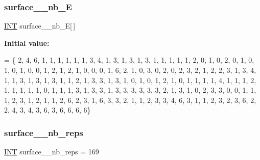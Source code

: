 \mbox{\label{surface__47_8_c_a28f7085424b2880a249384d131b2d762}} 
\subsubsection{\texorpdfstring{surface\+\_\+\_\+nb\+\_\+E}{surface\_47\_nb\_E}}
{\footnotesize\ttfamily \mbox{\hyperlink{galois_8h_a09fddde158a3a20bd2dcadb609de11dc}{I\+NT}} surface\+\_\+\_\+nb\+\_\+E\mbox{[}$\,$\mbox{]}}

{\bfseries Initial value\+:}
\begin{DoxyCode}
= \{ 
    2, 4, 6, 1, 1, 1, 1, 1, 1, 3, 
    4, 1, 3, 1, 3, 1, 3, 1, 1, 1, 
    1, 1, 2, 0, 1, 0, 2, 0, 1, 0, 
    1, 0, 1, 0, 0, 1, 2, 1, 2, 1, 
    0, 0, 0, 1, 6, 2, 1, 0, 3, 0, 
    2, 0, 2, 3, 2, 1, 2, 2, 3, 1, 
    3, 4, 1, 1, 3, 1, 3, 1, 3, 1, 
    1, 2, 1, 3, 3, 1, 3, 1, 0, 1, 
    0, 1, 2, 1, 0, 1, 1, 1, 1, 4, 
    1, 1, 1, 2, 1, 1, 1, 1, 1, 0, 
    1, 1, 1, 3, 1, 3, 3, 1, 3, 3, 
    3, 3, 3, 3, 2, 1, 3, 1, 0, 2, 
    3, 3, 0, 0, 1, 1, 1, 2, 3, 1, 
    2, 1, 1, 2, 6, 2, 3, 1, 6, 3, 
    3, 2, 1, 1, 2, 3, 3, 4, 6, 3, 
    1, 1, 2, 3, 2, 3, 6, 2, 2, 4, 
    3, 4, 3, 6, 3, 6, 6, 6, 6\}
\end{DoxyCode}
\mbox{\label{surface__47_8_c_a192ab06be18889cd107b36fa07d7490d}} 
\subsubsection{\texorpdfstring{surface\+\_\+\_\+nb\+\_\+reps}{surface\_47\_nb\_reps}}
{\footnotesize\ttfamily \mbox{\hyperlink{galois_8h_a09fddde158a3a20bd2dcadb609de11dc}{I\+NT}} surface\+\_\+\_\+nb\+\_\+reps = 169}

\mbox{\label{surface__47_8_c_a7ef3524245a04553edf39073b4d22adf}} 
